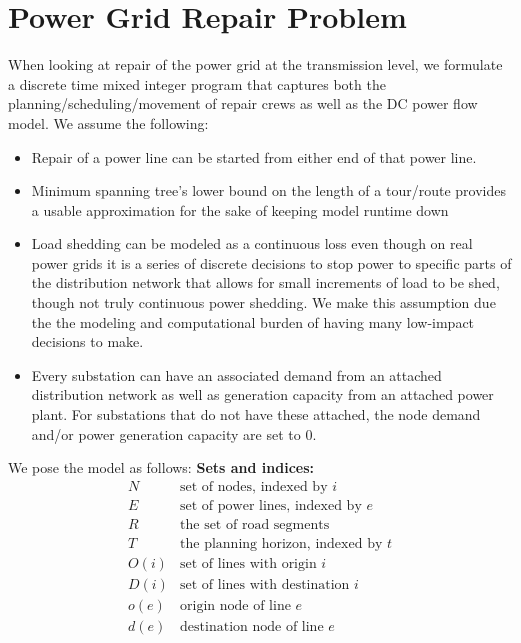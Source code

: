 \section{Power Grid Repair Problem}
When looking at repair of the power grid at the transmission level, we formulate a discrete time mixed integer program that captures both the planning/scheduling/movement of repair crews as well as the DC power flow model. We assume the following:
\begin{itemize}
	\item Repair of a power line can be started from either end of that power line.
	\item Minimum spanning tree's lower bound on the length of a tour/route provides a usable approximation for the sake of keeping model runtime down 
	\item Load shedding can be modeled as a continuous loss even though on real power grids it is a series of discrete decisions to stop power to specific parts of the distribution network that allows for small increments of load to be shed, though not truly continuous power shedding. We make this assumption due the the modeling and computational burden of having many low-impact decisions to make.
	\item Every substation can have an associated demand from an attached distribution network as well as generation capacity from an attached power plant. For substations that do not have these attached, the node demand and/or power generation capacity are set to 0.
\end{itemize}
We pose the model as follows:
\newline
\textbf{Sets and indices:}
\begin{displaymath}
\begin{array}{ll}
N & \mbox{set of nodes, indexed by $i$} \\
E & \mbox{set of power lines, indexed by $e$}\\
R & \mbox{the set of road segments} \\
T & \mbox{the planning horizon, indexed by $t$}  \\
O(i) & \mbox{set of lines with origin $i$} \\
D(i) & \mbox{set of lines with destination $i$} \\
o(e) & \mbox{origin node of line $e$} \\
d(e) & \mbox{destination node of line $e$} \\
\end{array}
\end{displaymath}
